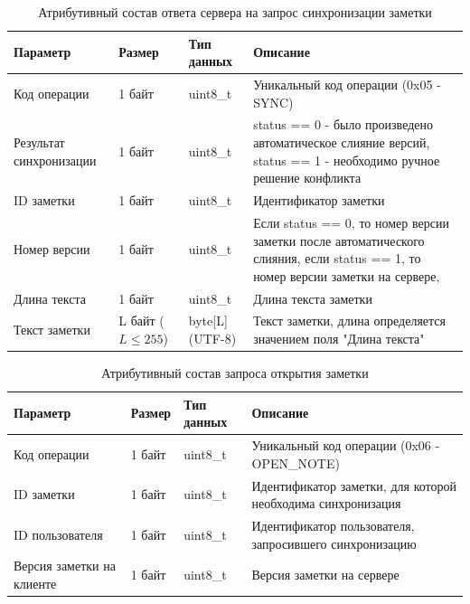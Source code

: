 \begin{table}[H]
    \centering
    \caption{Атрибутивный состав ответа сервера на запрос синхронизации заметки}
    \renewcommand{\arraystretch}{1.2}
    \begin{tabular}{|p{4cm}|p{2cm}|p{3cm}|p{6cm}|}
    \hline
    \textbf{Параметр} & \textbf{Размер} & \textbf{Тип данных} & \textbf{Описание} \\ \hline
    Код операции & 1 байт & uint8\_t & Уникальный код операции (0x05 - SYNC) \\ \hline
    Результат синхронизации & 1 байт & uint8\_t & status == 0 - было произведено автоматическое слияние версий, status == 1 - необходимо ручное решение конфликта \\ \hline
    ID заметки & 1 байт & uint8\_t & Идентификатор заметки \\ \hline
    Номер версии & 1 байт & uint8\_t & Если status == 0, то номер версии заметки после автоматического слияния, если status == 1, то номер версии заметки на сервере, \\ \hline
    Длина текста & 1 байт & uint8\_t & Длина текста заметки \\ \hline
    Текст заметки & L байт (\(L \le 255\)) & byte[L] (UTF-8) & Текст заметки, длина определяется значением поля "Длина текста" \\ \hline
    \end{tabular}
    \label{tab:note_create_response_min}
\end{table}


\begin{table}[H]
    \centering
    \caption{Атрибутивный состав запроса открытия заметки}
    \begin{tabular}{|p{4cm}|p{2cm}|p{3cm}|p{6cm}|}
    \hline
    \textbf{Параметр} & \textbf{Размер} & \textbf{Тип данных} & \textbf{Описание} \\ \hline
    Код операции & 1 байт & uint8\_t & Уникальный код операции (0x06 - OPEN\_NOTE) \\ \hline
    ID заметки & 1 байт & uint8\_t & Идентификатор заметки, для которой необходима синхронизация \\ \hline
    ID пользователя & 1 байт & uint8\_t & Идентификатор пользователя, запросившего синхронизацию \\ \hline
    Версия заметки на клиенте & 1 байт & uint8\_t & Версия заметки на сервере \\ \hline
    \end{tabular}
    \label{tab:note_create_request}
\end{table}


